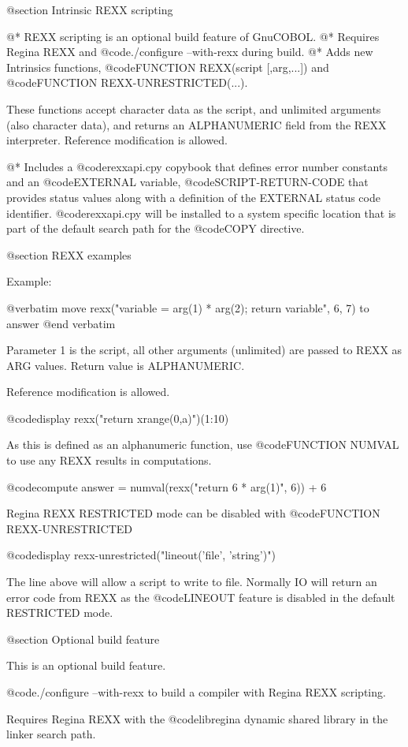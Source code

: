 @section Intrinsic REXX scripting

@*
REXX scripting is an optional build feature of GnuCOBOL.
@*
Requires Regina REXX and @code{./configure --with-rexx} during build.
@*
Adds new Intrinsics functions, @code{FUNCTION REXX(script [,arg,...])} and
@code{FUNCTION REXX-UNRESTRICTED(...)}.

These functions accept character data as the script, and unlimited arguments
(also character data), and returns an ALPHANUMERIC field from the REXX
interpreter.  Reference modification is allowed.

@* 
Includes a @code{rexxapi.cpy} copybook that defines error number constants and
an @code{EXTERNAL} variable, @code{SCRIPT-RETURN-CODE} that provides status
values along with a definition of the EXTERNAL status code identifier.
@code{rexxapi.cpy} will be installed to a system specific location that is part
of the default search path for the @code{COPY} directive.

@section REXX examples

Example:

@verbatim
    move rexx("variable = arg(1) * arg(2); return variable", 6, 7)
      to answer
@end verbatim

Parameter 1 is the script, all other arguments (unlimited) are passed to REXX
as ARG values. Return value is ALPHANUMERIC.

Reference modification is allowed.

    @code{display rexx("return xrange(0,a)")(1:10)}

As this is defined as an alphanumeric function, use @code{FUNCTION NUMVAL} to
use any REXX results in computations.

    @code{compute answer = numval(rexx("return 6 * arg(1)", 6)) + 6}

Regina REXX RESTRICTED mode can be disabled with @code{FUNCTION REXX-UNRESTRICTED}

    @code{display rexx-unrestricted("lineout('file', 'string')")}

The line above will allow a script to write to file. Normally IO will return an
error code from REXX as the @code{LINEOUT} feature is disabled in the default
RESTRICTED mode. 

@section Optional build feature

This is an optional build feature.

@code{./configure --with-rexx} to build a compiler with Regina REXX
scripting.

Requires Regina REXX with the @code{libregina} dynamic shared library in the
linker search path.
